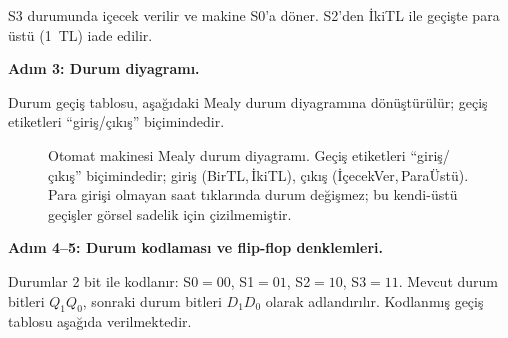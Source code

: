 \begin{ornek}[B.16]
\noindent S3 durumunda içecek verilir ve makine S0'a döner. S2'den İkiTL ile geçişte para üstü (1~TL) iade edilir.

\textbf{Adım 3: Durum diyagramı.}

Durum geçiş tablosu, aşağıdaki Mealy durum diyagramına dönüştürülür; geçiş etiketleri ``giriş/çıkış'' biçimindedir.

\begin{figure}[H]
\centering
{}
\caption*{Otomat makinesi Mealy durum diyagramı. Geçiş etiketleri ``giriş/çıkış'' biçimindedir; giriş (BirTL,\,İkiTL), çıkış (İçecekVer,\,ParaÜstü). Para girişi olmayan saat tıklarında durum değişmez; bu kendi-üstü geçişler görsel sadelik için çizilmemiştir.}
\end{figure}

\textbf{Adım 4--5: Durum kodlaması ve flip-flop denklemleri.}

Durumlar 2 bit ile kodlanır: S0$=00$, S1$=01$, S2$=10$, S3$=11$. Mevcut durum bitleri $Q_1 Q_0$, sonraki durum bitleri $D_1 D_0$ olarak adlandırılır. Kodlanmış geçiş tablosu aşağıda verilmektedir.


\end{ornek}
